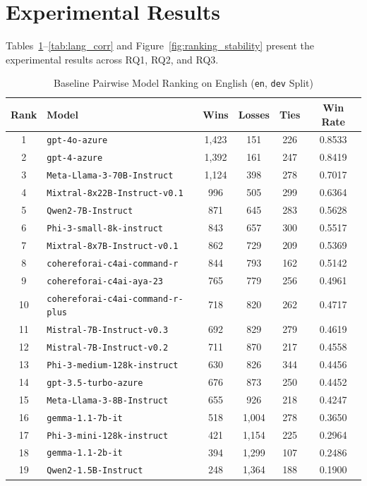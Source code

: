 \documentclass[sigconf]{acmart}
\begin{document}
\section{Experimental Results}
Tables~\ref{tab:en_ranking}--\ref{tab:lang_corr} and Figure~\ref{fig:ranking_stability} present the experimental results across RQ1, RQ2, and RQ3.

\begin{table}[t]
\centering
\caption{Baseline Pairwise Model Ranking on English (\texttt{en}, \texttt{dev} Split)}
\label{tab:en_ranking}
\scriptsize
\begin{tabular}{clcccc}
\toprule
\textbf{Rank} & \textbf{Model} & \textbf{Wins} & \textbf{Losses} & \textbf{Ties} & \textbf{Win Rate} \\
\midrule
1  & \texttt{gpt-4o-azure} & 1,423 & 151 & 226 & 0.8533 \\
2  & \texttt{gpt-4-azure} & 1,392 & 161 & 247 & 0.8419 \\
3  & \texttt{Meta-Llama-3-70B-Instruct} & 1,124 & 398 & 278 & 0.7017 \\
4  & \texttt{Mixtral-8x22B-Instruct-v0.1} & 996 & 505 & 299 & 0.6364 \\
5  & \texttt{Qwen2-7B-Instruct} & 871 & 645 & 283 & 0.5628 \\
6  & \texttt{Phi-3-small-8k-instruct} & 843 & 657 & 300 & 0.5517 \\
7  & \texttt{Mixtral-8x7B-Instruct-v0.1} & 862 & 729 & 209 & 0.5369 \\
8  & \texttt{cohereforai-c4ai-command-r} & 844 & 793 & 162 & 0.5142 \\
9  & \texttt{cohereforai-c4ai-aya-23} & 765 & 779 & 256 & 0.4961 \\
10 & \texttt{cohereforai-c4ai-command-r-plus} & 718 & 820 & 262 & 0.4717 \\
11 & \texttt{Mistral-7B-Instruct-v0.3} & 692 & 829 & 279 & 0.4619 \\
12 & \texttt{Mistral-7B-Instruct-v0.2} & 711 & 870 & 217 & 0.4558 \\
13 & \texttt{Phi-3-medium-128k-instruct} & 630 & 826 & 344 & 0.4456 \\
14 & \texttt{gpt-3.5-turbo-azure} & 676 & 873 & 250 & 0.4452 \\
15 & \texttt{Meta-Llama-3-8B-Instruct} & 655 & 926 & 218 & 0.4247 \\
16 & \texttt{gemma-1.1-7b-it} & 518 & 1,004 & 278 & 0.3650 \\
17 & \texttt{Phi-3-mini-128k-instruct} & 421 & 1,154 & 225 & 0.2964 \\
18 & \texttt{gemma-1.1-2b-it} & 394 & 1,299 & 107 & 0.2486 \\
19 & \texttt{Qwen2-1.5B-Instruct} & 248 & 1,364 & 188 & 0.1900 \\
\bottomrule
\end{tabular}
\end{table}
\end{document}
